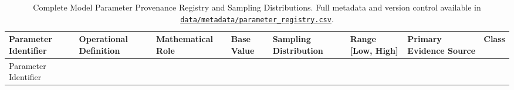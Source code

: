 \documentclass[
  11pt,
  a4paper]{article}
\begin{document}
\begin{longtable}[]{@{}
  >{\raggedright\arraybackslash}p{}
  >{\raggedright\arraybackslash}p{}
  >{\raggedright\arraybackslash}p{}
  >{\centering\arraybackslash}p{}
  >{\raggedright\arraybackslash}p{}
  >{\centering\arraybackslash}p{}
  >{\raggedright\arraybackslash}p{}
  >{\centering\arraybackslash}p{}@{}}
\caption{Complete Model Parameter Provenance Registry and Sampling
Distributions. Full metadata and version control available in
\href{file:///c:/Users/drfir/Documents/physician-exodus-tunisia/data/metadata/parameter_registry.csv}{\protect\texttt{data/metadata/parameter\_registry.csv}}.}\tabularnewline
\toprule\noalign{}
\begin{minipage}[b]{\linewidth}\raggedright
Parameter Identifier
\end{minipage} & \begin{minipage}[b]{\linewidth}\raggedright
Operational Definition
\end{minipage} & \begin{minipage}[b]{\linewidth}\raggedright
Mathematical Role
\end{minipage} & \begin{minipage}[b]{\linewidth}\centering
Base Value
\end{minipage} & \begin{minipage}[b]{\linewidth}\raggedright
Sampling Distribution
\end{minipage} & \begin{minipage}[b]{\linewidth}\centering
Range {[}Low, High{]}
\end{minipage} & \begin{minipage}[b]{\linewidth}\raggedright
Primary Evidence Source
\end{minipage} & \begin{minipage}[b]{\linewidth}\centering
Class
\end{minipage} \\
\midrule\noalign{}
\endfirsthead
\toprule\noalign{}
\begin{minipage}[b]{\linewidth}\raggedright
Parameter Identifier
\end{minipage} & \begin{minipage}[b]{\linewidth}\raggedright

\end{minipage}
\end{longtable}
\end{document}
